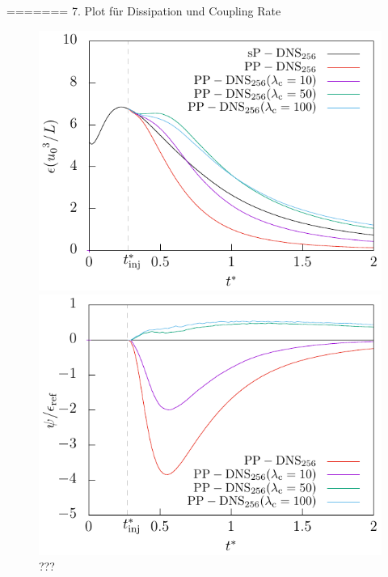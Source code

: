 \documentclass[11pt,a4paper,openany,oneside,parskip=half*]{article}
\begin{document}
=======
7. Plot für Dissipation und Coupling Rate
\newline
\begin{figure}[h]
    \centering
    \begin{minipage}{0.5\textwidth}
         \centering
        \includegraphics[width=\linewidth]{./Abbildungen/256/diss_time.pdf}
        \caption{???}
        \label{diss_time_256}
    \end{minipage}%
    \begin{minipage}{0.5\textwidth}
        \centering
        \includegraphics[width=\linewidth]{./Abbildungen/256/coupling_time.pdf}
        \caption{???}
        \label{coupling_time_256}
    \end{minipage}
\end{figure}
\end{document}
